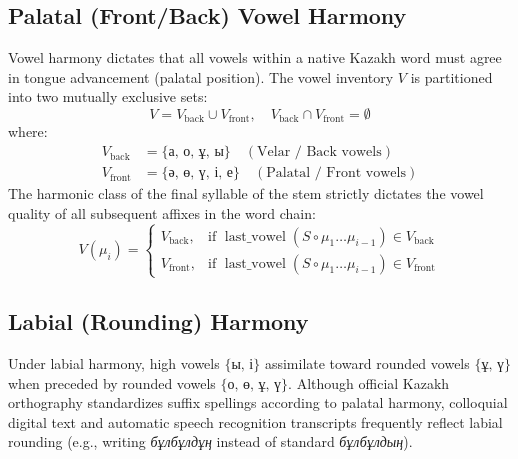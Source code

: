 \subsection{Palatal (Front/Back) Vowel Harmony}
Vowel harmony dictates that all vowels within a native Kazakh word must agree in tongue advancement (palatal position). The vowel inventory $V$ is partitioned into two mutually exclusive sets:
\begin{equation}
V = V_{\text{back}} \cup V_{\text{front}}, \quad V_{\text{back}} \cap V_{\text{front}} = \emptyset
\end{equation}
where:
\begin{align}
V_{\text{back}} &= \{\text{а, о, ұ, ы}\} \quad (\text{Velar / Back vowels}) \\
V_{\text{front}} &= \{\text{ә, ө, ү, і, е}\} \quad (\text{Palatal / Front vowels})
\end{align}
The harmonic class of the final syllable of the stem strictly dictates the vowel quality of all subsequent affixes in the word chain:
\begin{equation}
V(\mu_i) = \begin{cases}
V_{\text{back}}, & \text{if } \operatorname{last\_vowel}(S \circ \mu_1 \dots \mu_{i-1}) \in V_{\text{back}} \\
V_{\text{front}}, & \text{if } \operatorname{last\_vowel}(S \circ \mu_1 \dots \mu_{i-1}) \in V_{\text{front}}
\end{cases}
\end{equation}

\subsection{Labial (Rounding) Harmony}
Under labial harmony, high vowels $\{\text{ы, і}\}$ assimilate toward rounded vowels $\{\text{ұ, ү}\}$ when preceded by rounded vowels $\{\text{о, ө, ұ, ү}\}$. Although official Kazakh orthography standardizes suffix spellings according to palatal harmony, colloquial digital text and automatic speech recognition transcripts frequently reflect labial rounding (e.g., writing \textit{бұлбұлдұң} instead of standard \textit{бұлбұлдың}).

